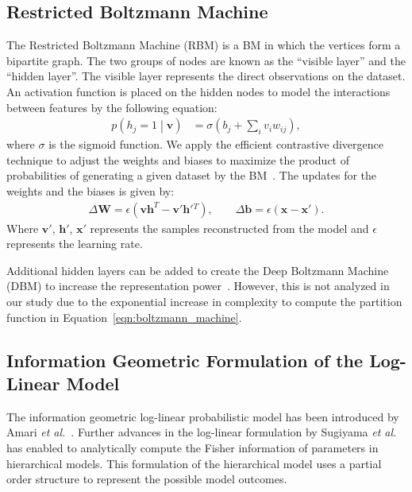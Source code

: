\documentclass[letterpaper]{article} %
\begin{document}
	\subsection{Restricted Boltzmann Machine}
		The Restricted Boltzmann Machine (RBM) is a BM in which the vertices form a bipartite graph. The two groups of nodes are known as the ``visible layer'' and the ``hidden layer''. The visible layer represents the direct observations on the dataset. An activation function is placed on the hidden nodes to model the interactions between features by the following equation:
		\begin{align*}
			p \left( h_j = 1 \middle| \mathbf{v} \right) &= \sigma \left( b_j + \sum_i v_i w_{ij} \right) ,
		\end{align*}
		where $\sigma$ is the sigmoid function.
		We apply the efficient contrastive divergence technique to adjust the weights and biases to maximize the product of probabilities of generating a given dataset by the BM~\cite{Hinton02,Tieleman08}. The updates for the weights and the biases is given by:
		\begin{align*}
			\Delta \mathbf{W} = \epsilon \left( \mathbf{v} \mathbf{h}^T - \mathbf{v}' \mathbf{h}'{}^T \right), \qquad \Delta \mathbf{b} = \epsilon \left( \mathbf{x} - \mathbf{x}' \right).
		\end{align*}
		Where $\mathbf{v}'$, $\mathbf{h}'$, $\mathbf{x}'$ represents the samples reconstructed from the model and $\epsilon$ represents the learning rate.

		Additional hidden layers can be added to create the Deep Boltzmann Machine (DBM) to increase the representation power~\cite{Salakhutdinov09,Salakhutdinov12}. However, this is not analyzed in our study due to the exponential increase in complexity to compute the partition function in Equation~\eqref{eqn:boltzmann_machine}.

	\subsection{Information Geometric Formulation of the Log-Linear Model} \label{sec:loglinearmodel}
		The information geometric log-linear probabilistic model has been introduced by Amari \textit{et al.}~\cite{amari2001information,nakahara2002information,nakahara2006comparison}. Further advances in the log-linear formulation by Sugiyama \textit{et al.}~\cite{sugiyama2016information} has enabled to analytically compute the Fisher information of parameters in hierarchical models. This formulation of the hierarchical model uses a partial order structure to represent the possible model outcomes.
\end{document}
